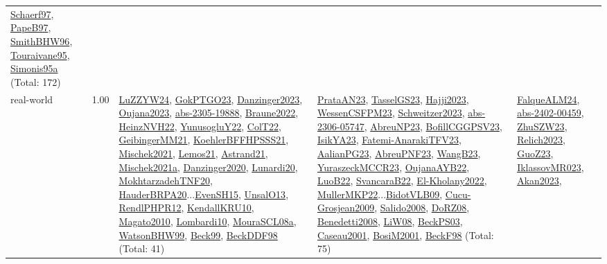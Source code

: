 {\begin{longtable}{p{3cm}r>{\raggedright\arraybackslash}p{6cm}>{\raggedright\arraybackslash}p{6cm}>{\raggedright\arraybackslash}p{8cm}}
\hyperref[detail:Schaerf97]{Schaerf97}, \hyperref[detail:PapeB97]{PapeB97}, \hyperref[detail:SmithBHW96]{SmithBHW96}, \hyperref[detail:Touraivane95]{Touraivane95}, \hyperref[detail:Simonis95a]{Simonis95a} (Total: 172)\\
\index{real-world}\index{Benchmarks!real-world}real-world &  1.00 & \hyperref[detail:LuZZYW24]{LuZZYW24}, \hyperref[detail:GokPTGO23]{GokPTGO23}, \hyperref[detail:Danzinger2023]{Danzinger2023}, \hyperref[detail:Oujana2023]{Oujana2023}, \hyperref[detail:abs-2305-19888]{abs-2305-19888}, \hyperref[detail:Braune2022]{Braune2022}, \hyperref[detail:HeinzNVH22]{HeinzNVH22}, \hyperref[detail:YunusogluY22]{YunusogluY22}, \hyperref[detail:ColT22]{ColT22}, \hyperref[detail:GeibingerMM21]{GeibingerMM21}, \hyperref[detail:KoehlerBFFHPSSS21]{KoehlerBFFHPSSS21}, \hyperref[detail:Mischek2021]{Mischek2021}, \hyperref[detail:Lemos21]{Lemos21}, \hyperref[detail:Astrand21]{Astrand21}, \hyperref[detail:Mischek2021a]{Mischek2021a}, \hyperref[detail:Danzinger2020]{Danzinger2020}, \hyperref[detail:Lunardi20]{Lunardi20}, \hyperref[detail:MokhtarzadehTNF20]{MokhtarzadehTNF20}, \hyperref[detail:HauderBRPA20]{HauderBRPA20}...\hyperref[detail:EvenSH15]{EvenSH15}, \hyperref[detail:UnsalO13]{UnsalO13}, \hyperref[detail:RendlPHPR12]{RendlPHPR12}, \hyperref[detail:KendallKRU10]{KendallKRU10}, \hyperref[detail:Magato2010]{Magato2010}, \hyperref[detail:Lombardi10]{Lombardi10}, \hyperref[detail:MouraSCL08a]{MouraSCL08a}, \hyperref[detail:WatsonBHW99]{WatsonBHW99}, \hyperref[detail:Beck99]{Beck99}, \hyperref[detail:BeckDDF98]{BeckDDF98} (Total: 41) & \hyperref[detail:PrataAN23]{PrataAN23}, \hyperref[detail:TasselGS23]{TasselGS23}, \hyperref[detail:Hajji2023]{Hajji2023}, \hyperref[detail:WessenCSFPM23]{WessenCSFPM23}, \hyperref[detail:Schweitzer2023]{Schweitzer2023}, \hyperref[detail:abs-2306-05747]{abs-2306-05747}, \hyperref[detail:AbreuNP23]{AbreuNP23}, \hyperref[detail:BofillCGGPSV23]{BofillCGGPSV23}, \hyperref[detail:IsikYA23]{IsikYA23}, \hyperref[detail:Fatemi-AnarakiTFV23]{Fatemi-AnarakiTFV23}, \hyperref[detail:AalianPG23]{AalianPG23}, \hyperref[detail:AbreuPNF23]{AbreuPNF23}, \hyperref[detail:WangB23]{WangB23}, \hyperref[detail:YuraszeckMCCR23]{YuraszeckMCCR23}, \hyperref[detail:OujanaAYB22]{OujanaAYB22}, \hyperref[detail:LuoB22]{LuoB22}, \hyperref[detail:SvancaraB22]{SvancaraB22}, \hyperref[detail:El-Kholany2022]{El-Kholany2022}, \hyperref[detail:MullerMKP22]{MullerMKP22}...\hyperref[detail:BidotVLB09]{BidotVLB09}, \hyperref[detail:Cucu-Grosjean2009]{Cucu-Grosjean2009}, \hyperref[detail:Salido2008]{Salido2008}, \hyperref[detail:DoRZ08]{DoRZ08}, \hyperref[detail:Benedetti2008]{Benedetti2008}, \hyperref[detail:LiW08]{LiW08}, \hyperref[detail:BeckPS03]{BeckPS03}, \hyperref[detail:Caseau2001]{Caseau2001}, \hyperref[detail:BosiM2001]{BosiM2001}, \hyperref[detail:BeckF98]{BeckF98} (Total: 75) & \hyperref[detail:FalqueALM24]{FalqueALM24}, \hyperref[detail:abs-2402-00459]{abs-2402-00459}, \hyperref[detail:ZhuSZW23]{ZhuSZW23}, \hyperref[detail:Relich2023]{Relich2023}, \hyperref[detail:GuoZ23]{GuoZ23}, \hyperref[detail:IklassovMR023]{IklassovMR023}, \hyperref[detail:Akan2023]{Akan2023}, 
\end{longtable}}
